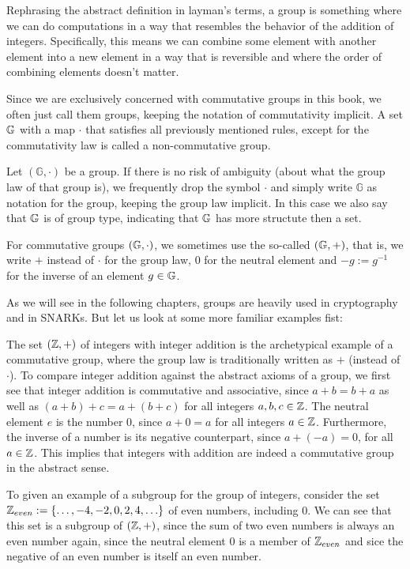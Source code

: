 Rephrasing the abstract definition in layman's terms, a group is something where we can do computations in a way that resembles the behavior of the addition of integers. Specifically, this means we can combine some element with another element into a new element in a way that is reversible and where the order of combining elements doesn't matter.
\begin{notation}Since we are exclusively concerned with commutative groups in this book, we often just call them groups, keeping the notation of commutativity implicit.
A set $\mathbb{G}$ with a map $\cdot$ that satisfies all previously mentioned rules, except for the commutativity law is called a non-commutative group. 

Let $(\mathbb{G},\cdot)$ be a group. If there is no risk of ambiguity (about what the group law of that group is), we frequently drop the symbol $\cdot$ and simply write $\mathbb{G}$ as notation for the group, keeping the group law implicit. In this case we also say that $\mathbb{G}$ is of group type, indicating that $\mathbb{G}$ has more structute then a set.

For commutative groups $(\mathbb{G},\cdot)$, we sometimes use the so-called  $(\mathbb{G},+)$, that is, we write $+$ instead of $\cdot$ for the group law, $0$ for the neutral element and $-g:=g^{-1}$ for the inverse of an element $g\in\mathbb{G}$.
\end{notation}
As we will see in the following chapters, groups are heavily used in cryptography and in SNARKs. But let us look at some more familiar examples fist:
\begin{example}
\label{example:group_of_integers}
The set $(\mathbb{Z},+)$ of integers with integer addition is the archetypical example of a commutative group, where the group law is traditionally written as $+$ (instead of $\cdot$). To compare integer addition against the abstract axioms of a group, we first see that integer addition is commutative and associative, since $a+b = b+a$ as well as $(a+b)+c=a+(b+c)$ for all integers $a,b,c\in \mathbb{Z}$. The neutral element $e$ is the number $0$, since $a+0=a$ for all integers $a\in \mathbb{Z}$. Furthermore, the inverse of a number is its negative counterpart, since $a+(-a)=0$, for all $a\in\mathbb{Z}$. This implies that integers with addition are indeed a commutative group in the abstract sense.

To given an example of a subgroup for the group of integers, consider the set $\mathbb{Z}_{even}:=\{\ldots,-4,-2,0,2,4,\ldots\}$ of even numbers, including $0$. We can see that this set is a subgroup of $(\mathbb{Z},+)$, since the sum of two even numbers is always an even number again, since the neutral element $0$ is a member of $\mathbb{Z}_{even}$ and sice the negative of an even number is itself an even number. 
\end{example}
